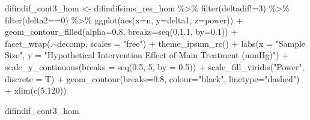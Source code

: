 \documentclass[
]{article}
\newenvironment{Shaded}{\begin{snugshade}}{\end{snugshade}}
\newcommand{\AttributeTok}[1]{\textcolor[rgb]{0.77,0.63,0.00}{#1}}
\newcommand{\DecValTok}[1]{\textcolor[rgb]{0.00,0.00,0.81}{#1}}
\newcommand{\FloatTok}[1]{\textcolor[rgb]{0.00,0.00,0.81}{#1}}
\newcommand{\FunctionTok}[1]{\textcolor[rgb]{0.00,0.00,0.00}{#1}}
\newcommand{\NormalTok}[1]{#1}
\newcommand{\OtherTok}[1]{\textcolor[rgb]{0.56,0.35,0.01}{#1}}
\newcommand{\SpecialCharTok}[1]{\textcolor[rgb]{0.00,0.00,0.00}{#1}}
\newcommand{\StringTok}[1]{\textcolor[rgb]{0.31,0.60,0.02}{#1}}
\begin{document}
\begin{Shaded}
\begin{Highlighting}[]
\NormalTok{difindif\_cont3\_hom }\OtherTok{\textless{}{-}}\NormalTok{ difindifsims\_res\_hom }\SpecialCharTok{\%\textgreater{}\%} 
  \FunctionTok{filter}\NormalTok{(deltadif}\SpecialCharTok{!=}\DecValTok{3}\NormalTok{) }\SpecialCharTok{\%\textgreater{}\%} 
  \FunctionTok{filter}\NormalTok{(delta2}\SpecialCharTok{==}\DecValTok{0}\NormalTok{) }\SpecialCharTok{\%\textgreater{}\%} 
  \FunctionTok{ggplot}\NormalTok{(}\FunctionTok{aes}\NormalTok{(}\AttributeTok{x=}\NormalTok{n, }\AttributeTok{y=}\NormalTok{delta1, }\AttributeTok{z=}\NormalTok{power)) }\SpecialCharTok{+}
  \FunctionTok{geom\_contour\_filled}\NormalTok{(}\AttributeTok{alpha=}\FloatTok{0.8}\NormalTok{, }\AttributeTok{breaks=}\FunctionTok{seq}\NormalTok{(}\DecValTok{0}\NormalTok{,}\FloatTok{1.1}\NormalTok{, }\AttributeTok{by=}\FloatTok{0.1}\NormalTok{)) }\SpecialCharTok{+}
  \FunctionTok{facet\_wrap}\NormalTok{(.}\SpecialCharTok{\textasciitilde{}}\NormalTok{decomp, }\AttributeTok{scales =} \StringTok{"free"}\NormalTok{) }\SpecialCharTok{+}
  \FunctionTok{theme\_ipsum\_rc}\NormalTok{() }\SpecialCharTok{+}
  \FunctionTok{labs}\NormalTok{(}\AttributeTok{x =} \StringTok{"Sample Size"}\NormalTok{,}
       \AttributeTok{y =} \StringTok{"Hypothetical Intervention Effect of Main Treatment (mmHg)"}\NormalTok{) }\SpecialCharTok{+}
  \FunctionTok{scale\_y\_continuous}\NormalTok{(}\AttributeTok{breaks =} \FunctionTok{seq}\NormalTok{(}\FloatTok{0.5}\NormalTok{, }\DecValTok{5}\NormalTok{, }\AttributeTok{by =} \FloatTok{0.5}\NormalTok{)) }\SpecialCharTok{+}
  \FunctionTok{scale\_fill\_viridis}\NormalTok{(}\StringTok{"Power"}\NormalTok{, }\AttributeTok{discrete =}\NormalTok{ T) }\SpecialCharTok{+}
  \FunctionTok{geom\_contour}\NormalTok{(}\AttributeTok{breaks=}\FloatTok{0.8}\NormalTok{, }\AttributeTok{colour=}\StringTok{"black"}\NormalTok{, }\AttributeTok{linetype=}\StringTok{"dashed"}\NormalTok{) }\SpecialCharTok{+}
  \FunctionTok{xlim}\NormalTok{(}\FunctionTok{c}\NormalTok{(}\DecValTok{5}\NormalTok{,}\DecValTok{120}\NormalTok{))}

\NormalTok{difindif\_cont3\_hom}
\end{Highlighting}
\end{Shaded}
\end{document}

